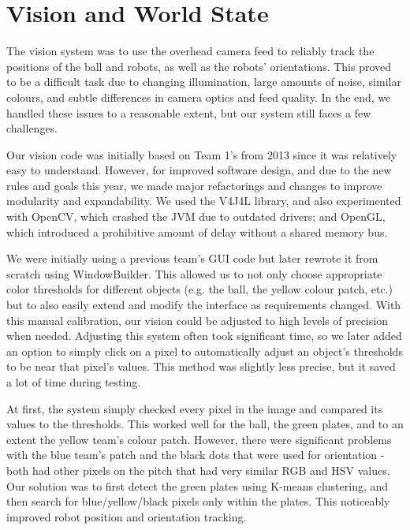 \documentclass[a4paper,11pt]{article}
\begin{document}

\section{Vision and World State}

The vision system was to use the overhead camera feed to reliably track the positions of the ball and robots, as well as the robots’ orientations. This proved to be a difficult task due to changing illumination, large amounts of noise, similar colours, and subtle differences in camera optics and feed quality. In the end, we handled these issues to a reasonable extent, but our system still faces a few challenges.

Our vision code was initially based on Team 1’s from 2013 since it was relatively easy to understand. However, for improved software design, and due to the new rules and goals this year, we made major refactorings and changes to improve modularity and expandability. We used the V4J4L library, and also experimented with OpenCV, which crashed the JVM due to outdated drivers; and OpenGL, which introduced a prohibitive amount of delay without a shared memory bus.

We were initially using a previous team’s GUI code but later rewrote it from scratch using WindowBuilder. This allowed us to not only choose appropriate color thresholds for different objects (e.g. the ball, the yellow colour patch, etc.) but to also easily extend and modify the interface as requirements changed. With this manual calibration, our vision could be adjusted to high levels of precision when needed. Adjusting this system often took significant time, so we later added an option to simply click on a pixel to automatically adjust an object’s thresholds to be near that pixel’s values. This method was slightly less precise, but it saved a lot of time during testing.

At first, the system simply checked every pixel in the image and compared its values to the thresholds. This worked well for the ball, the green plates, and to an extent the yellow team’s colour patch. However, there were significant problems with the blue team’s patch and the black dots that were used for orientation - both had other pixels on the pitch that had very similar RGB and HSV values. Our solution was to first detect the green plates using K-means clustering, and then search for blue/yellow/black pixels only within the plates. This noticeably improved robot position and orientation tracking. 
\end{document}
